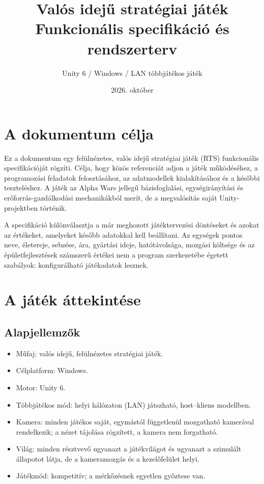 \documentclass[12pt,a4paper]{article}
\title{\textbf{Valós idejű stratégiai játék}\\Funkcionális specifikáció és rendszerterv}
\author{Unity 6 / Windows / LAN többjátékos játék}
\date{2026. október}
\begin{document}
\maketitle
\tableofcontents
\newpage

\section{A dokumentum célja}

Ez a dokumentum egy felülnézetes, valós idejű stratégiai játék (RTS) funkcionális specifikációját rögzíti. Célja, hogy közös referenciát adjon a játék működéséhez, a programozási feladatok felosztásához, az adatmodellek kialakításához és a későbbi teszteléshez. A játék az Alpha Wars jellegű bázisfoglalási, egységirányítási és erőforrás-gazdálkodási mechanikákból merít, de a megvalósítás saját Unity-projektben történik.

A specifikáció különválasztja a már meghozott játéktervezési döntéseket és azokat az értékeket, amelyeket később adatokkal kell beállítani. Az egységek pontos neve, életereje, sebzése, ára, gyártási ideje, hatótávolsága, mozgási költsége és az épületfejlesztések számszerű értékei nem a program szerkezetébe égetett szabályok: konfigurálható játékadatok lesznek.

\section{A játék áttekintése}

\subsection{Alapjellemzők}

\begin{itemize}
  \item Műfaj: valós idejű, felülnézetes stratégiai játék.
  \item Célplatform: Windows.
  \item Motor: Unity 6.
  \item Többjátékos mód: helyi hálózaton (LAN) játszható, host--kliens modellben.
  \item Kamera: minden játékos saját, egymástól függetlenül mozgatható kamerával rendelkezik; a nézet tájolása rögzített, a kamera nem forgatható.
  \item Világ: minden résztvevő ugyanazt a játékvilágot és ugyanazt a szimulált állapotot látja, de a kameramozgás és a kezelőfelület helyi.
  \item Játékmód: kompetitív; a mérkőzésnek egyetlen győztese van.
\end{itemize}
\end{document}
